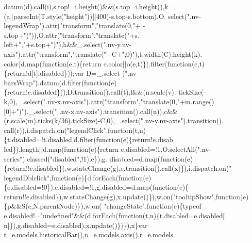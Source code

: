 \begin{DoxyCode}
      datum(d).call(i),s.top!=i.height()&&(s.top=i.height(),k=(a||parseInt(T.style(\textcolor{stringliteral}{"height"}))||400)-s.top-s.bottom),O.
      select(\textcolor{stringliteral}{".nv-legendWrap"}).attr(\textcolor{stringliteral}{"transform"},\textcolor{stringliteral}{"translate(0,"}+ -s.top+\textcolor{stringliteral}{")"})),O.attr(\textcolor{stringliteral}{"transform"},\textcolor{stringliteral}{"translate("}+s.
      left+\textcolor{stringliteral}{","}+s.top+\textcolor{stringliteral}{")"}),h&&\_.select(\textcolor{stringliteral}{".nv-y.nv-axis"}).attr(\textcolor{stringliteral}{"transform"},\textcolor{stringliteral}{"translate("}+C+\textcolor{stringliteral}{",0)"}),t.width(C).height(k).
      color(d.map(\textcolor{keyword}{function}(e,t)\{return e.color||o(e,t)\}).filter(\textcolor{keyword}{function}(e,t)\{\textcolor{keywordflow}{return}!d[t].disabled\}));var D=\_.select
      (\textcolor{stringliteral}{".nv-barsWrap"}).datum(d.filter(\textcolor{keyword}{function}(e)\{return!e.disabled\}));D.transition().call(t),l&&(n.scale(v).
      tickSize(-k,0),\_.select(\textcolor{stringliteral}{".nv-x.nv-axis"}).attr(\textcolor{stringliteral}{"transform"},\textcolor{stringliteral}{"translate(0,"}+m.range()[0]+\textcolor{stringliteral}{")"}),\_.select(\textcolor{stringliteral}{"
      .nv-x.nv-axis"}).transition().call(n)),c&&(r.scale(m).ticks(k/36).tickSize(-C,0),\_.select(\textcolor{stringliteral}{".nv-y.nv-axis"}).transition().
      call(r)),i.dispatch.on(\textcolor{stringliteral}{"legendClick"},\textcolor{keyword}{function}(t,n)\{t.disabled=!t.disabled,d.filter(function(e)\{return!e.disab
      led\}).length||d.map(\textcolor{keyword}{function}(e)\{\textcolor{keywordflow}{return} e.disabled=!1,O.selectAll(\textcolor{stringliteral}{".nv-series"}).classed(\textcolor{stringliteral}{"disabled"},!1),e\}),g.
      disabled=d.map(\textcolor{keyword}{function}(e)\{return!!e.disabled\}),w.stateChange(g),e.transition().call(x)\}),i.dispatch.on(\textcolor{stringliteral}{"
      legendDblclick"},\textcolor{keyword}{function}(e)\{d.forEach(function(e)\{e.disabled=!0\}),e.disabled=!1,g.disabled=d.map(\textcolor{keyword}{function}(e)\{\textcolor{keywordflow}{
      return}!!e.disabled\}),w.stateChange(g),x.update()\}),w.on(\textcolor{stringliteral}{"tooltipShow"},\textcolor{keyword}{function}(e)\{p&&S(e,N.parentNode)\}),w.on(\textcolor{stringliteral}{
      "changeState"},\textcolor{keyword}{function}(e)\{typeof e.disabled!=\textcolor{stringliteral}{"undefined"}&&(d.forEach(\textcolor{keyword}{function}(t,n)\{t.disabled=e.disabled[
      n]\}),g.disabled=e.disabled),x.update()\})\}),x\}var t=e.models.historicalBar(),n=e.models.axis(),r=e.models.

\end{DoxyCode}
